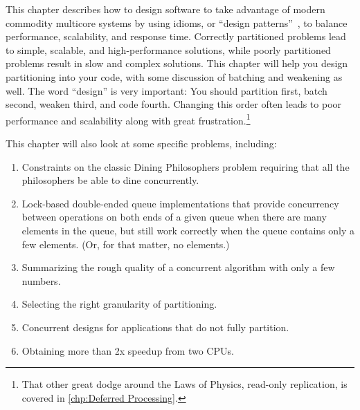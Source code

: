 
%

This chapter describes how to design software to take advantage of
modern commodity multicore systems by using idioms, or
``design patterns''~\cite{Alexander79,GOF95,SchmidtStalRohnertBuschmann2000v2Textbook},
to balance performance, scalability, and response time.
Correctly partitioned problems lead to simple, scalable, and
high-performance solutions, while poorly partitioned problems result
in slow and complex solutions.
This chapter will help you design partitioning into your code, with
some discussion of batching and weakening as well.
The word ``design'' is very important:
You should partition first, batch second, weaken third, and code fourth.
Changing this order often leads to poor performance and scalability
along with great frustration.\footnote{
	That other great dodge around the Laws of Physics, read-only
	replication, is covered in \cref{chp:Deferred Processing}.}

This chapter will also look at some specific problems, including:

\begin{enumerate}
\item	Constraints on the classic Dining Philosophers problem requiring
	that all the philosophers be able to dine concurrently.
\label{sec:SMPdesign:Problems Dining Philosophers}
\item	Lock-based double-ended queue implementations that provide
	concurrency between operations on both ends of a given queue
	when there are many elements in the queue, but still work
	correctly when the queue contains only a few elements.
	(Or, for that matter, no elements.)
\label{sec:SMPdesign:Problems Double-Ended Queue}
\item	Summarizing the rough quality of a concurrent algorithm with only
	a few numbers.
\label{sec:SMPdesign:Problems Quality Assessment}
\item	Selecting the right granularity of partitioning.
\label{sec:SMPdesign:Problems Granularity}
\item	Concurrent designs for applications that do not fully partition.
\label{sec:SMPdesign:Problems Parallel Fastpath}
\item	Obtaining more than 2x speedup from two CPUs.
\label{sec:SMPdesign:Problems Maze}
\end{enumerate}

